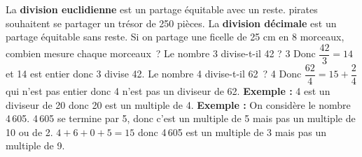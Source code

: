 \documentclass{thecours}
\begin{document}
    \noindent
    La {\bfseries division euclidienne} est un partage équitable avec un reste.\vskip8pt pirates souhaitent se partager un trésor de 250 pièces.
    \noindent
    La {\bfseries division décimale} est un partage équitable sans reste.\vskip8pt\noindent
    Si on partage une ficelle de 25 cm en 8 morceaux, combien mesure chaque
    morceaux~?
     Le nombre 3 divise-t-il 42 ?\vskip10pt
     3 Donc $\dfrac{42}3=14$ et 14 est entier donc 3 divise 42.
     \vskip5pt
     Le nombre 4 divise-t-il 62~?\vskip10pt
     4 Donc $\dfrac{62}4=15+\dfrac24$ qui n'est pas entier donc 4
     n'est pas un diviseur de 62.
     {\bfseries Exemple :} 4 est un diviseur de 20 donc 20 est un multiple de 4.
     {\bfseries Exemple :} On considère le nombre 4\,605.\vskip5pt
     4\,605 se termine par 5, donc c'est un multiple de 5 mais pas un multiple
     de 10 ou de 2.\vskip5pt
     $4+6+0+5=15$ donc 4\,605 est un multiple de 3 mais pas un multiple
     de 9.
\end{document}

